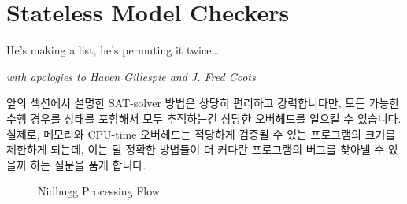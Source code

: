 
\section{Stateless Model Checkers}
\label{sec:formal:Stateless Model Checkers}
%
\epigraph{He's making a list, he's permuting it twice\dots}
	{\emph{with apologies to Haven Gillespie and J. Fred Coots}}

앞의 섹션에서 설명한 SAT-solver 방법은 상당히 편리하고 강력합니다만, 모든
가능한 수행 경우를 상태를 포함해서 모두 추적하는건 상당한 오버헤드를 일으킬 수
있습니다.
실제로, 메모리와 CPU-time 오버헤드는 적당하게 검증될 수 있는 프로그램의 크기를
제한하게 되는데, 이는 덜 정확한 방법들이 더 커다란 프로그램의 버그를 찾아낼 수
있을까 하는 질문을 품게 합니다.

\begin{figure}[tbp]
\centering
{}
\caption{Nidhugg Processing Flow}
\label{fig:formal:Nidhugg Processing Flow}
\end{figure}

